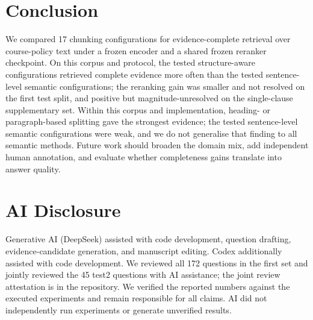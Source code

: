 \documentclass[conference]{IEEEtran}
\begin{document}
\section{Conclusion}
We compared 17 chunking configurations for evidence-complete retrieval over course-policy text under a frozen encoder and a shared frozen reranker checkpoint. On this corpus and protocol, the tested structure-aware configurations retrieved complete evidence more often than the tested sentence-level semantic configurations; the reranking gain was smaller and not resolved on the first test split, and positive but magnitude-unresolved on the single-clause supplementary set. Within this corpus and implementation, heading- or paragraph-based splitting gave the strongest evidence; the tested sentence-level semantic configurations were weak, and we do not generalise that finding to all semantic methods. Future work should broaden the domain mix, add independent human annotation, and evaluate whether completeness gains translate into answer quality.

\section*{AI Disclosure}
Generative AI (DeepSeek) assisted with code development, question drafting, evidence-candidate generation, and manuscript editing. Codex additionally assisted with code development. We reviewed all 172 questions in the first set and jointly reviewed the 45 test2 questions with AI assistance; the joint review attestation is in the repository. We verified the reported numbers against the executed experiments and remain responsible for all claims. AI did not independently run experiments or generate unverified results.



\end{document}
